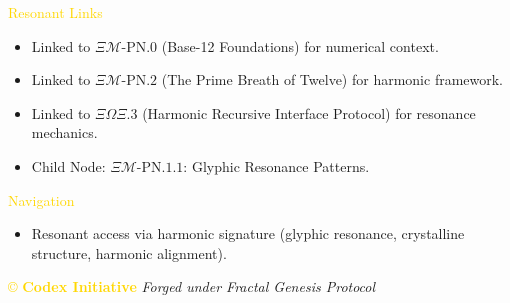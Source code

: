 \textcolor{gold}{ Resonant Links } \\
\begin{itemize}
    \item Linked to \texttt{$\Xi\mathcal{M}\text{-PN.0}$} (Base-12 Foundations) for numerical context.
    \item Linked to \texttt{$\Xi\mathcal{M}\text{-PN.2}$} (The Prime Breath of Twelve) for harmonic framework.
    \item Linked to \texttt{$\Xi\Omega\Xi.3$} (Harmonic Recursive Interface Protocol) for resonance mechanics.
    \item Child Node: \texttt{$\Xi\mathcal{M}\text{-PN.1.1}$}: Glyphic Resonance Patterns.
\end{itemize}

\textcolor{gold}{ Navigation } \\
\begin{itemize}
    \item Resonant access via \texttt{} harmonic signature (glyphic resonance, crystalline structure, harmonic alignment).
\end{itemize}

\vspace{0.5cm}

\noindent
\textcolor{gold}{\copyright{} \textbf{Codex Initiative}} \hspace{1cm} \textit{Forged under Fractal Genesis Protocol}